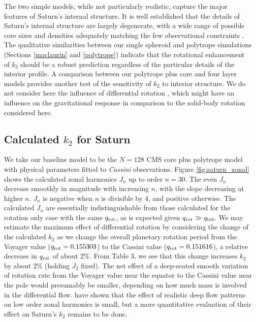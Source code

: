The two simple models, while not particularly realistic, capture the major features
of Saturn's internal structure. It is well established that the details of Saturn's
internal structure are largely degenerate, with a wide range of possible core sizes
and densities adequately matching the few observational constraints
\citep{kramm2011,helled2013,Nettelmann2013}.  The qualitative similarities between
our single spheroid and polytrope simulations (Sections \ref{maclaurin} and
\ref{polytrope}) indicate that the rotational enhancement of $k_2$ should be a robust
prediction regardless of the particular details of the interior profile. A comparison
between our polytrope plus core and four layer models provides another test of the
sensitivity of $k_2$ to interior structure.  We do not consider here the influence of
differential rotation \citep{hubbard1982,Kong2013,cao2015,wisdom2016}, which might
have an influence on the gravitational response in comparison to the solid-body
rotation considered here.  

\subsection{Calculated $k_2$ for Saturn} \label{calc_k2}

We take our baseline model to be the $N=128$ CMS core plus polytrope model with
physical parameters fitted to \textit{Cassini} observations. Figure
\ref{fig:saturn_zonal} shows the calculated zonal harmonics $J_n$ up to order
$n=30$.  The even $J_n$ decrease smoothly in magnitude with increasing $n$,
with the slope decreasing at higher $n$.  $J_n$ is negative when $n$ is
divisible by 4, and positive otherwise.  The calculated $J_n$ are essentially
indistinguishable from those calculated for the rotation only case with the
same $q_{\rm rot}$, as is expected given $q_{\rm rot} \gg q_{\rm tid}$. We may
estimate the maximum effect of differential rotation by considering the change
of the calculated $k_2$ as we change the overall planetary rotation period from
the Voyager value ($q_{\rm rot} = 0.155303$) to the Cassini value ($q_{\rm rot}
= 0.151616$), a relative decrease in $q_{\rm rot} $ of about $2 \%$.  From
Table 3, we see that this change increases $k_2$ by about $2 \%$ (holding $J_2$
fixed).  The net effect of a deep-seated smooth variation of rotation rate from
the Voyager value near the equator to the Cassini value near the pole would
presumably be smaller, depending on how much mass is involved in the
differential flow.  \citet{cao2015} have shown that the effect of
realistic deep flow patterns on low order zonal harmonics is small, but a more
quantitative evaluation of their effect on Saturn's $k_2$ remains to be done.

